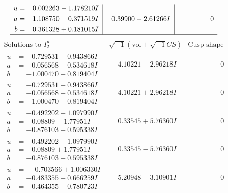 \documentclass[1p]{elsarticle_modified}
\theoremstyle{definition}
\newcommand{\I}{\sqrt{-1}}
\begin{document}
$$\begin{array}{c|c|c}
\begin{aligned}
u &= \phantom{-}0.002263 - 1.178210 I \\
a &= -1.108750 - 0.371519 I \\
b &= \phantom{-}0.361328 + 0.181015 I\end{aligned}
 & \phantom{-}0.39900 - 2.61266 I & \phantom{-0.000000 } 0\\
 \hline 
 \end{array}$$\newpage$$\begin{array}{c|c|c}  
\text{Solutions to }I^u_{2}& \I (\text{vol} + \sqrt{-1}CS) & \text{Cusp shape}\\
 \hline 
\begin{aligned}
u &= -0.729531 + 0.943866 I \\
a &= -0.056568 + 0.534618 I \\
b &= -1.000470 - 0.819404 I\end{aligned}
 & \phantom{-}4.10221 - 2.96218 I & \phantom{-0.000000 } 0 \\ \hline\begin{aligned}
u &= -0.729531 - 0.943866 I \\
a &= -0.056568 - 0.534618 I \\
b &= -1.000470 + 0.819404 I\end{aligned}
 & \phantom{-}4.10221 + 2.96218 I & \phantom{-0.000000 } 0 \\ \hline\begin{aligned}
u &= -0.492202 + 1.097990 I \\
a &= -0.08809 - 1.77951 I \\
b &= -0.876103 + 0.595338 I\end{aligned}
 & \phantom{-}0.33545 + 5.76360 I & \phantom{-0.000000 } 0 \\ \hline\begin{aligned}
u &= -0.492202 - 1.097990 I \\
a &= -0.08809 + 1.77951 I \\
b &= -0.876103 - 0.595338 I\end{aligned}
 & \phantom{-}0.33545 - 5.76360 I & \phantom{-0.000000 } 0 \\ \hline\begin{aligned}
u &= \phantom{-}0.703566 + 1.006330 I \\
a &= -0.483355 + 0.666259 I \\
b &= -0.464355 - 0.780723 I\end{aligned}
 & \phantom{-}5.20948 - 3.10901 I & \phantom{-0.000000 } 0 \\ \hline\begin{aligned}

\end{aligned}
\end{array}$$
\end{document}
